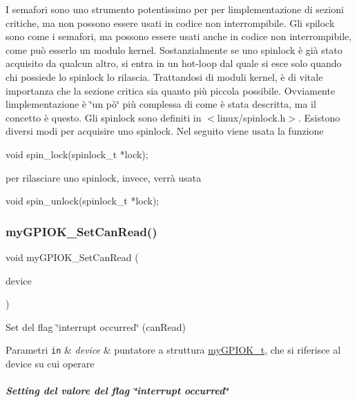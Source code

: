 I semafori sono uno strumento potentissimo per per l\textquotesingle{}implementazione di sezioni critiche, ma non possono essere usati in codice non interrompibile. Gli spilock sono come i semafori, ma possono essere usati anche in codice non interrompibile, come può esserlo un modulo kernel. Sostanzialmente se uno spinlock è già stato acquisito da qualcun altro, si entra in un hot-\/loop dal quale si esce solo quando chi possiede lo spinlock lo rilascia. Trattandosi di moduli kernel, è di vitale importanza che la sezione critica sia quanto più piccola possibile. Ovviamente l\textquotesingle{}implementazione è \char`\"{}un pò\char`\"{} più complessa di come è stata descritta, ma il concetto è questo. Gli spinlock sono definiti in $<$linux/spinlock.\+h$>$. Esistono diversi modi per acquisire uno spinlock. Nel seguito viene usata la funzione 
\begin{DoxyCode}
\textcolor{keywordtype}{void} spin\_lock(spinlock\_t *lock);
\end{DoxyCode}
 per rilasciare uno spinlock, invece, verrà usata 
\begin{DoxyCode}
\textcolor{keywordtype}{void} spin\_unlock(spinlock\_t *lock);
\end{DoxyCode}
 \mbox{\label{group___linux-_driver_gad82c1051e6acb335b1b26ab0c459453b}} 
\subsubsection{\texorpdfstring{my\+G\+P\+I\+O\+K\+\_\+\+Set\+Can\+Read()}{myGPIOK\_SetCanRead()}}
{\footnotesize\ttfamily void my\+G\+P\+I\+O\+K\+\_\+\+Set\+Can\+Read (\begin{DoxyParamCaption}\item[{\hyperlink{structmy_g_p_i_o_k__t}{my\+G\+P\+I\+O\+K\+\_\+t} $\ast$}]{device }\end{DoxyParamCaption})}



Set del flag \char`\"{}interrupt occurred\char`\"{} (can\+Read) 


\begin{DoxyParams}[1]{Parametri}
\mbox{\tt in}  & {\em device} & puntatore a struttura \hyperlink{structmy_g_p_i_o_k__t}{my\+G\+P\+I\+O\+K\+\_\+t}, che si riferisce al device su cui operare\\
\hline
\end{DoxyParams}
\subparagraph*{Setting del valore del flag \char`\"{}interrupt occurred\char`\"{}}

